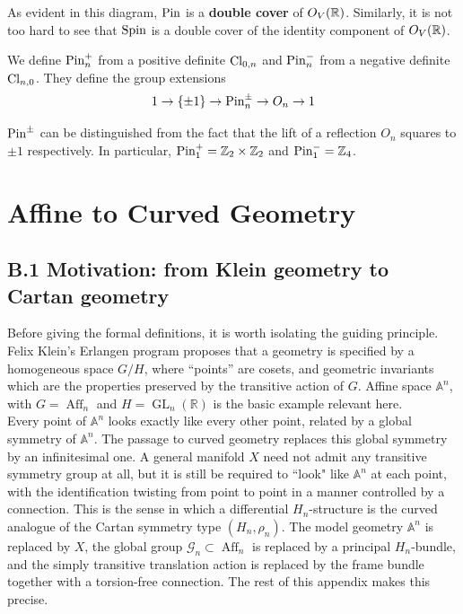 \documentclass[a4paper,11pt]{article}
\begin{document}
\begin{appendices}
As evident in this diagram, ${\rm Pin}$ is a {\bf double cover} of $O_V({\mathbb{R}})$. Similarly, it is not too hard to see that ${\rm Spin}$ is a double cover of the identity component of $O_V(\mathbb{R})$.

\begin{definition}[${\rm Pin}^{\pm}_n$]
    We define ${\rm Pin}^{+}_n$ from a positive definite ${\rm Cl}_{0,n}$ and ${\rm Pin}^{-}_n$ from a negative definite ${\rm Cl}_{n,0}$. They define the group extensions
    \begin{equation*}
        1 \to \{\pm 1\} \to {\rm Pin}^{\pm}_n \to O_n \to 1
    \end{equation*}
\end{definition}
\begin{remark}
    ${\rm Pin}^{\pm}$ can be distinguished from the fact that the lift of a reflection $O_n$ squares to ${\pm 1}$ respectively. In particular, ${\rm Pin}^+_1 = \mathbb{Z}_2 \times \mathbb{Z}_2$ and ${\rm Pin}^-_1 = \mathbb{Z}_4$.
\end{remark}

\section{Affine to Curved Geometry}

\subsection*{B.1 Motivation: from Klein geometry to Cartan geometry}

Before giving the formal definitions, it is worth isolating the guiding
principle. Felix Klein's Erlangen program proposes that a geometry is
specified by a homogeneous space $G/H$, where ``points'' are cosets, and geometric invariants which are the properties preserved by the transitive action of $G$. Affine space $\mathbb{A}^n$, with
$G=\operatorname{Aff}_n$ and $H=\operatorname{GL}_n(\mathbb{R})$ is the basic example relevant here.\\

Every point of $\mathbb{A}^n$ looks exactly like every other point, related by a global symmetry of $\mathbb{A}^n$. The passage to curved geometry replaces this global symmetry by an infinitesimal one. A general manifold $X$ need not admit any transitive symmetry group at all, but it is still be required to ``look" like $\mathbb{A}^n$ at each point, with the identification twisting from point to point in a manner controlled by a
connection. This is the sense in which a differential $H_n$-structure is the curved analogue of the Cartan symmetry type $(H_n,\rho_n)$. The model geometry $\mathbb{A}^n$ is replaced by $X$, the global group $\mathcal G_n\subset\operatorname{Aff}_n$ is replaced by a principal $H_n$-bundle, and the simply transitive translation action is replaced by the frame bundle together with a torsion-free connection. The rest of this appendix makes this precise.


\end{appendices}
\end{document}

